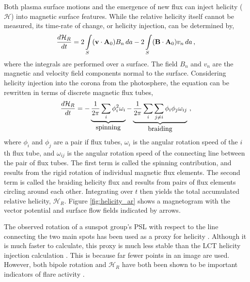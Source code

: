 Both plasma surface motions and the emergence of new flux can inject helicity ($\mathcal{H}$) into magnetic surface features. While the relative helicity itself cannot be measured, its time-rate of change, or helicity injection, can be determined by,
\begin{equation}
\frac{d \mathcal{H}_R}{dt} = 2 \int \limits_{S} (\vec{v}\cdot\vec{A}_0)B_n\,da - 2 \int \limits_{S} (\vec{B}\cdot\vec{A}_0)v_n\,da \mbox{\,,}
\end{equation}
where the integrals are performed over a surface. The field $B_n$ and $v_n$ are the magnetic and velocity field components normal to the surface.
Considering helicity injection into the corona from the photosphere, the equation can be rewritten in terms of discrete magnetic flux tubes,
\begin{equation}
\frac{d \mathcal{H}_R}{dt} = - \underbrace{\frac{1}{2\pi} \sum \limits_{i} \phi_i^2\omega_i}_{\mbox{spinning}} - \underbrace{\frac{1}{2\pi} \sum \limits_{i} \sum \limits_{j \ne i} \phi_i \phi_j \omega_{ij}}_{\mbox{braiding}} \mbox{\,,}
\end{equation}
where $\phi_i$ and $\phi_j$ are a pair if flux tubes, $\omega_i$ is the angular rotation speed of the $i$th flux tube, and $\omega_{ij}$ is the angular rotation speed of the connecting line between the pair of flux tubes. The first term is called the spinning contribution, and results from the rigid rotation of individual magnetic flux elements. The second term is called the braiding helicity flux and results from pairs of flux elements circling around each other. Integrating over $t$ then yields the total accumulated relative helicity, $\mathcal{H}_R$. Figure \ref{fig:helicity_ar} shows a magnetogram with the vector potential and surface flow fields indicated by arrows.


The observed rotation of a sunspot group's \gls{PSL} with respect to the line connecting the two main spots has been used as a proxy for helicity \citep{Morita:2005}. Although it is much faster to calculate, this proxy is much less stable than the \gls{LCT} helicity injection calculation \citep{Chae:2001,Verbeeck:2011}. This is because far fewer points in an image are used. However, both bipole rotation and $\mathcal{H}_R$ have both been shown to be important indicators of flare activity \citep{Morita:2005,Chae:2004}.


